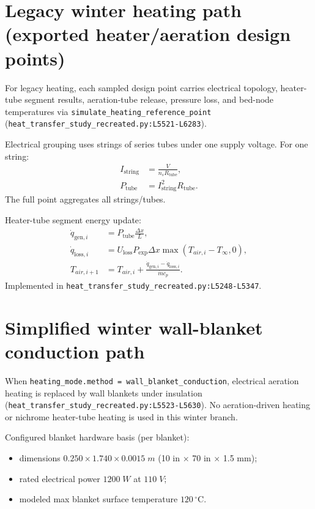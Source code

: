 \documentclass[11pt]{article}
\newcommand{\srcref}[1]{\nolinkurl{#1}}
\newcommand{\code}[1]{\nolinkurl{#1}}
\begin{document}
\section{Legacy winter heating path (exported heater/aeration design points)}
For legacy heating, each sampled design point carries electrical topology,
heater-tube segment results, aeration-tube release, pressure loss, and bed-node
temperatures via \code{simulate\_heating\_reference\_point}
(\srcref{heat_transfer_study_recreated.py:L5521-L6283}).

Electrical grouping uses strings of series tubes under one supply voltage.
For one string:
\begin{align}
I_{\mathrm{string}} &= \frac{V}{n_s R_{\mathrm{tube}}}, \\
P_{\mathrm{tube}} &= I_{\mathrm{string}}^2 R_{\mathrm{tube}}.
\end{align}
The full point aggregates all strings/tubes.

Heater-tube segment energy update:
\begin{align}
\dot q_{\mathrm{gen},i} &= P_{\mathrm{tube}}\frac{\Delta x}{L}, \\
\dot q_{\mathrm{loss},i} &= U_{\mathrm{loss}} P_{\mathrm{exp}}\Delta x
\max(T_{air,i}-T_\infty,0), \\
T_{air,i+1} &= T_{air,i} +
\frac{\dot q_{\mathrm{gen},i}-\dot q_{\mathrm{loss},i}}
{\dot m c_p}.
\end{align}
Implemented in \srcref{heat_transfer_study_recreated.py:L5248-L5347}.

\section{Simplified winter wall-blanket conduction path}
When \code{heating\_mode.method = wall\_blanket\_conduction}, electrical aeration
heating is replaced by wall blankets under insulation
(\srcref{heat_transfer_study_recreated.py:L5523-L5630}).
No aeration-driven heating or nichrome heater-tube heating is used in this
winter branch.

Configured blanket hardware basis (per blanket):
\begin{itemize}[leftmargin=*]
\item dimensions \(0.250\times1.740\times0.0015\;\si{m}\) (10 in \(\times\) 70 in \(\times\) 1.5 mm);
\item rated electrical power \(1200\;\si{W}\) at \(110\;\si{V}\);
\item modeled max blanket surface temperature \(120\,^\circ\mathrm{C}\).
\end{itemize}
\end{document}
